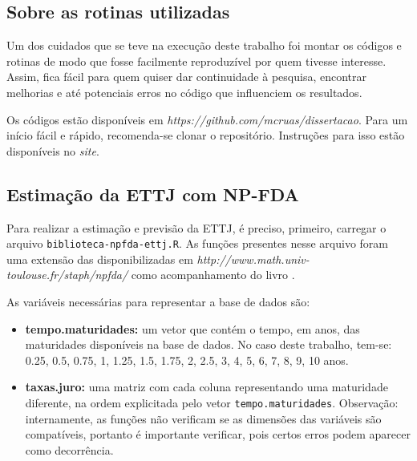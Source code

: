\documentclass[
	12pt,				%
	openright,			%
	oneside,			%
	a4paper,			%
	english,			%
	brazil				%
	]{dissertacao-ufrgs-abntex2}
\begin{document}
\begin{apendicesenv}
%
%
%
%
%
%


\chapter{Sobre as rotinas utilizadas} \label{apend:rotinas}

Um dos cuidados que se teve na execução deste trabalho foi montar os códigos e rotinas de modo que fosse facilmente reproduzível por quem tivesse interesse. Assim, fica fácil para quem quiser dar continuidade à pesquisa, encontrar melhorias e até potenciais erros no código que influenciem os resultados.

Os códigos estão disponíveis em \emph{https://github.com/mcruas/dissertacao}. Para um início fácil e rápido, recomenda-se clonar o repositório. Instruções para isso estão disponíveis no \emph{site}.

\section{Estimação da ETTJ com NP-FDA}
Para realizar a estimação e previsão da ETTJ, é preciso, primeiro, carregar o arquivo \texttt{biblioteca-npfda-ettj.R}. As funções presentes nesse arquivo foram uma extensão das disponibilizadas em \emph{http://www.math.univ-toulouse.fr/staph/npfda/} como acompanhamento do livro .

As variáveis necessárias para representar a base de dados são:
\begin{itemize}
\item \textbf{tempo.maturidades:} um vetor que contém o tempo, em anos, das maturidades disponíveis na base de dados. No caso deste trabalho, tem-se:
0.25, 0.5, 0.75, 1,  1.25,  1.5,  1.75,	2,	2.5,	3,	4,	5,	6,	7,	8,	9,	10 anos.
\item \textbf{taxas.juro:} uma matriz com cada coluna representando uma maturidade diferente, na ordem explicitada pelo vetor \texttt{tempo.maturidades}. Observação: internamente, as funções não verificam se as dimensões das variáveis são compatíveis, portanto é importante verificar, pois certos erros podem aparecer como decorrência.
\end{itemize}


\end{apendicesenv}
\end{document}
